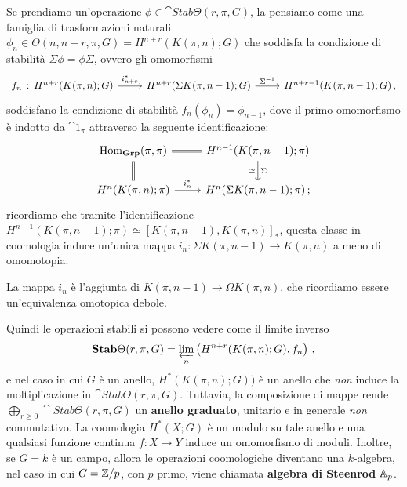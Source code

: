 


Se prendiamo un'operazione $\phi \in \cat{Stab}\Theta(r,\pi,G)$, 
la pensiamo come una famiglia di trasformazioni naturali
$\phi_{n} \in \Theta(n,n+r,\pi,G) = H^{n+r}(K(\pi,n);G)$ che soddisfa la condizione di
stabilità $\Sigma \phi = \phi \Sigma$, ovvero gli omomorfismi
\begin{equation*}
	\begin{tikzcd}
		f_{n} \, : \, H^{n+r}(K(\pi,n);G) \ar[r, "i_{n+r}^{*}"]
		& H^{n+r}(\Sigma K(\pi,n-1);G) \ar[r, "\Sigma^{-1}"]
		& H^{n+r-1}(K(\pi,n-1);G)\,,
	\end{tikzcd}
\end{equation*}
soddisfano la condizione di stabilità $f_{n}(\phi_{n}) = \phi_{n-1}$,
dove il primo omomorfismo è indotto da $\cat{1}_{\pi}$
attraverso la seguente identificazione:
\begin{equation*}
	\begin{tikzcd}
		\Hom_{\cat{Grp}}(\pi,\pi) \ar[r, equals] \ar[d, equals]
		& H^{n-1}(K(\pi,n-1);\pi) \ar[d, "\Sigma", "\simeq"'] \\
		H^{n}(K(\pi,n);\pi) \ar[r,"i^{*}_{n}"]
		& H^{n}(\Sigma K(\pi,n-1);\pi)\,;
	\end{tikzcd}
\end{equation*}
ricordiamo che tramite l'identificazione
$H^{n-1}(K(\pi,n-1);\pi) \simeq [K(\pi,n-1),K(\pi,n)]_{\ast}$,
questa classe in coomologia induce un'unica mappa
$i_{n}:\Sigma K(\pi,n-1) \to K(\pi,n)$ a meno di omomotopia.

\begin{oss}
	La mappa $i_{n}$ è l'aggiunta di $K(\pi,n-1) \to \Omega K(\pi,n)$,
	che ricordiamo essere un'equivalenza omotopica debole.
\end{oss}

Quindi le operazioni stabili si possono vedere come il limite inverso
\begin{equation*}
	\cat{Stab}\Theta(r,\pi,G) = \varprojlim_{n}\left( H^{n+r}(K(\pi,n);G),f_{n}\right)\,,
\end{equation*}
e nel caso in cui $G$ è un anello, $H^{*}(K(\pi,n);G))$ è un anello
che \emph{non} induce la moltiplicazione in $\cat{Stab}\Theta(r,\pi,G)$.
Tuttavia, la composizione di mappe rende  $\bigoplus_{r \ge 0}\cat{Stab}\Theta(r,\pi,G)$
un \textbf{anello graduato}, unitario e in generale \emph{non} commutativo.
La coomologia $H^{*}(X;G)$ è un modulo su tale anello e una
qualsiasi funzione continua $f:X \to Y$ induce un omomorfismo di moduli.
Inoltre, se $G=k$ è un campo, allora le operazioni coomologiche diventano
una $k$-algebra, nel caso in cui $G=\Z/p$, con $p$ primo,
viene chiamata \textbf{algebra di Steenrod} $\AA_{p}$.